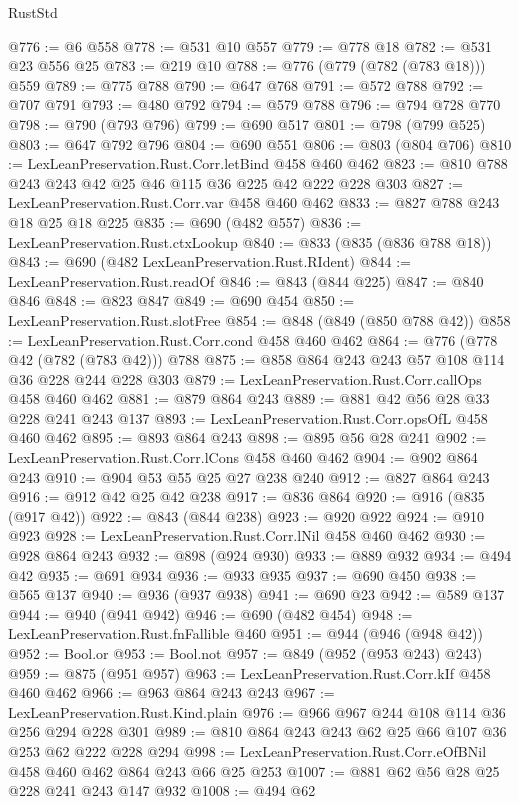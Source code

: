 \begin{lexlean}{RustStd}
\begin{coremodule}
{\begin{coremodule}
{{{{{{{{{@776 := @6 @558
@778 := @531 @10 @557
@779 := @778 @18
@782 := @531 @23 @556 @25
@783 := @219 @10
@788 := @776 (@779 (@782 (@783 @18))) @559
@789 := @775 @788
@790 := @647 @768
@791 := @572 @788
@792 := @707 @791
@793 := @480 @792
@794 := @579 @788
@796 := @794 @728 @770
@798 := @790 (@793 @796)
@799 := @690 @517
@801 := @798 (@799 @525)
@803 := @647 @792 @796
@804 := @690 @551
@806 := @803 (@804 @706)
@810 := LexLeanPreservation.Rust.Corr.letBind @458 @460 @462
@823 := @810 @788 @243 @243 @42 @25 @46 @115 @36 @225 @42 @222 @228 @303
@827 := LexLeanPreservation.Rust.Corr.var @458 @460 @462
@833 := @827 @788 @243 @18 @25 @18 @225
@835 := @690 (@482 @557)
@836 := LexLeanPreservation.Rust.ctxLookup
@840 := @833 (@835 (@836 @788 @18))
@843 := @690 (@482 LexLeanPreservation.Rust.RIdent)
@844 := LexLeanPreservation.Rust.readOf
@846 := @843 (@844 @225)
@847 := @840 @846
@848 := @823 @847
@849 := @690 @454
@850 := LexLeanPreservation.Rust.slotFree
@854 := @848 (@849 (@850 @788 @42))
@858 := LexLeanPreservation.Rust.Corr.cond @458 @460 @462
@864 := @776 (@778 @42 (@782 (@783 @42))) @788
@875 := @858 @864 @243 @243 @57 @108 @114 @36 @228 @244 @228 @303
@879 := LexLeanPreservation.Rust.Corr.callOps @458 @460 @462
@881 := @879 @864 @243
@889 := @881 @42 @56 @28 @33 @228 @241 @243 @137
@893 := LexLeanPreservation.Rust.Corr.opsOfL @458 @460 @462
@895 := @893 @864 @243
@898 := @895 @56 @28 @241
@902 := LexLeanPreservation.Rust.Corr.lCons @458 @460 @462
@904 := @902 @864 @243
@910 := @904 @53 @55 @25 @27 @238 @240
@912 := @827 @864 @243
@916 := @912 @42 @25 @42 @238
@917 := @836 @864
@920 := @916 (@835 (@917 @42))
@922 := @843 (@844 @238)
@923 := @920 @922
@924 := @910 @923
@928 := LexLeanPreservation.Rust.Corr.lNil @458 @460 @462
@930 := @928 @864 @243
@932 := @898 (@924 @930)
@933 := @889 @932
@934 := @494 @42
@935 := @691 @934
@936 := @933 @935
@937 := @690 @450
@938 := @565 @137
@940 := @936 (@937 @938)
@941 := @690 @23
@942 := @589 @137
@944 := @940 (@941 @942)
@946 := @690 (@482 @454)
@948 := LexLeanPreservation.Rust.fnFallible @460
@951 := @944 (@946 (@948 @42))
@952 := Bool.or
@953 := Bool.not
@957 := @849 (@952 (@953 @243) @243)
@959 := @875 (@951 @957)
@963 := LexLeanPreservation.Rust.Corr.kIf @458 @460 @462
@966 := @963 @864 @243 @243
@967 := LexLeanPreservation.Rust.Kind.plain
@976 := @966 @967 @244 @108 @114 @36 @256 @294 @228 @301
@989 := @810 @864 @243 @243 @62 @25 @66 @107 @36 @253 @62 @222 @228 @294
@998 := LexLeanPreservation.Rust.Corr.eOfBNil @458 @460 @462 @864 @243 @66 @25 @253
@1007 := @881 @62 @56 @28 @25 @228 @241 @243 @147 @932
@1008 := @494 @62
}}}}}}}}}
\end{coremodule}}
\end{coremodule}
\end{lexlean}
